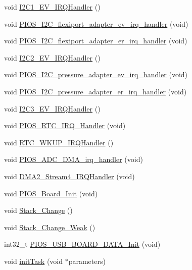 \begin{DoxyCompactItemize}
\item 
void \hyperlink{group___revolution_gad0e17b57fe51ed2861178f06899345c0}{\-I2\-C1\-\_\-\-E\-V\-\_\-\-I\-R\-Q\-Handler} ()
\item 
void \hyperlink{group___revolution_ga0b5322143194be1bdf24d9cc88ca275e}{\-P\-I\-O\-S\-\_\-\-I2\-C\-\_\-flexiport\-\_\-adapter\-\_\-ev\-\_\-irq\-\_\-handler} (void)
\item 
void \hyperlink{group___revolution_ga7ae5d4453562364b12d1a9a55c2c9717}{\-P\-I\-O\-S\-\_\-\-I2\-C\-\_\-flexiport\-\_\-adapter\-\_\-er\-\_\-irq\-\_\-handler} (void)
\item 
void \hyperlink{group___revolution_gaa32a80208798d6132876a58823ff6202}{\-I2\-C2\-\_\-\-E\-V\-\_\-\-I\-R\-Q\-Handler} ()
\item 
void \hyperlink{group___revolution_ga7e50e4f3e62dd5e68d7d45ec01d1c367}{\-P\-I\-O\-S\-\_\-\-I2\-C\-\_\-pressure\-\_\-adapter\-\_\-ev\-\_\-irq\-\_\-handler} (void)
\item 
void \hyperlink{group___revolution_gac7417688efc77b991f77ec10f190e83e}{\-P\-I\-O\-S\-\_\-\-I2\-C\-\_\-pressure\-\_\-adapter\-\_\-er\-\_\-irq\-\_\-handler} (void)
\item 
void \hyperlink{group___revolution_ga749eb918c398cc3f11f47ec317757573}{\-I2\-C3\-\_\-\-E\-V\-\_\-\-I\-R\-Q\-Handler} ()
\item 
void \hyperlink{group___revolution_gadc73bf2eccd9d9ff9d8efedd1e743704}{\-P\-I\-O\-S\-\_\-\-R\-T\-C\-\_\-\-I\-R\-Q\-\_\-\-Handler} (void)
\item 
void \hyperlink{group___revolution_ga7e78266985c97f3b7e8a9f91893657d1}{\-R\-T\-C\-\_\-\-W\-K\-U\-P\-\_\-\-I\-R\-Q\-Handler} ()
\item 
void \hyperlink{group___revolution_gab1b0c9556e9feacd794f636f33e63d90}{\-P\-I\-O\-S\-\_\-\-A\-D\-C\-\_\-\-D\-M\-A\-\_\-irq\-\_\-handler} (void)
\item 
void \hyperlink{group___revolution_ga295198ed574625d416158a5fc54205ea}{\-D\-M\-A2\-\_\-\-Stream4\-\_\-\-I\-R\-Q\-Handler} (void)
\item 
void \hyperlink{group___revolution_ga902009c5b1cb57d9f9d60092eb7cacfb}{\-P\-I\-O\-S\-\_\-\-Board\-\_\-\-Init} (void)
\item 
void \hyperlink{group___revolution_gacffe9380a0cef10c00911dba2c2ed394}{\-Stack\-\_\-\-Change} ()
\item 
void \hyperlink{group___revolution_gaa883cddf4e5d9fa47ec9b16a446b8d40}{\-Stack\-\_\-\-Change\-\_\-\-Weak} ()
\item 
int32\-\_\-t \hyperlink{group___revolution_ga5efd94ab761f254827f38dba474cf642}{\-P\-I\-O\-S\-\_\-\-U\-S\-B\-\_\-\-B\-O\-A\-R\-D\-\_\-\-D\-A\-T\-A\-\_\-\-Init} (void)
\item 
void \hyperlink{group___revolution_gae7ecc4ed0ea5858477b78acaf928c3ef}{init\-Task} (void $\ast$parameters)
\end{DoxyCompactItemize}
